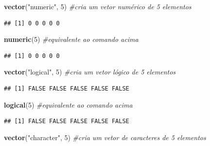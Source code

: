 \documentclass[
]{book}
\newenvironment{Shaded}{\begin{snugshade}}{\end{snugshade}}
\newcommand{\CommentTok}[1]{\textcolor[rgb]{0.56,0.35,0.01}{\textit{#1}}}
\newcommand{\DecValTok}[1]{\textcolor[rgb]{0.00,0.00,0.81}{#1}}
\newcommand{\FunctionTok}[1]{\textcolor[rgb]{0.13,0.29,0.53}{\textbf{#1}}}
\newcommand{\NormalTok}[1]{#1}
\newcommand{\StringTok}[1]{\textcolor[rgb]{0.31,0.60,0.02}{#1}}
\begin{document}
\begin{Shaded}
\begin{Highlighting}[]
\FunctionTok{vector}\NormalTok{(}\StringTok{"numeric"}\NormalTok{, }\DecValTok{5}\NormalTok{) }\CommentTok{\#cria um vetor numérico de 5 elementos}
\end{Highlighting}
\end{Shaded}

\begin{verbatim}
## [1] 0 0 0 0 0
\end{verbatim}

\begin{Shaded}
\begin{Highlighting}[]
\FunctionTok{numeric}\NormalTok{(}\DecValTok{5}\NormalTok{) }\CommentTok{\#equivalente ao comando acima}
\end{Highlighting}
\end{Shaded}

\begin{verbatim}
## [1] 0 0 0 0 0
\end{verbatim}

\begin{Shaded}
\begin{Highlighting}[]
\FunctionTok{vector}\NormalTok{(}\StringTok{"logical"}\NormalTok{, }\DecValTok{5}\NormalTok{) }\CommentTok{\#cria um vetor lógico de 5 elementos}
\end{Highlighting}
\end{Shaded}

\begin{verbatim}
## [1] FALSE FALSE FALSE FALSE FALSE
\end{verbatim}

\begin{Shaded}
\begin{Highlighting}[]
\FunctionTok{logical}\NormalTok{(}\DecValTok{5}\NormalTok{) }\CommentTok{\#equivalente ao comando acima}
\end{Highlighting}
\end{Shaded}

\begin{verbatim}
## [1] FALSE FALSE FALSE FALSE FALSE
\end{verbatim}

\begin{Shaded}
\begin{Highlighting}[]
\FunctionTok{vector}\NormalTok{(}\StringTok{"character"}\NormalTok{, }\DecValTok{5}\NormalTok{) }\CommentTok{\#cria um vetor de caracteres de 5 elementos}
\end{Highlighting}
\end{Shaded}
\end{document}
